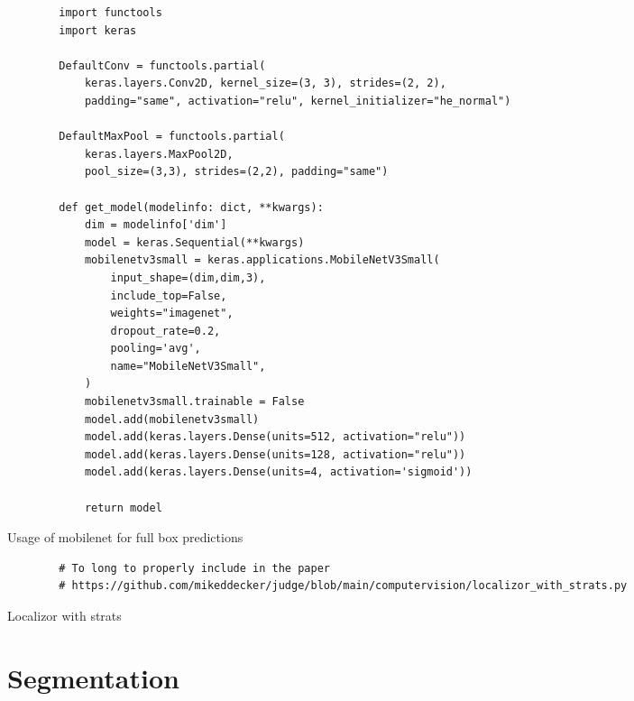 \begin{listing}
    \begin{verbatim}
        import functools
        import keras

        DefaultConv = functools.partial(
            keras.layers.Conv2D, kernel_size=(3, 3), strides=(2, 2),
            padding="same", activation="relu", kernel_initializer="he_normal")

        DefaultMaxPool = functools.partial(
            keras.layers.MaxPool2D,
            pool_size=(3,3), strides=(2,2), padding="same")

        def get_model(modelinfo: dict, **kwargs):
            dim = modelinfo['dim']
            model = keras.Sequential(**kwargs)
            mobilenetv3small = keras.applications.MobileNetV3Small(
                input_shape=(dim,dim,3),
                include_top=False,
                weights="imagenet",
                dropout_rate=0.2,
                pooling='avg',
                name="MobileNetV3Small",
            )
            mobilenetv3small.trainable = False
            model.add(mobilenetv3small)
            model.add(keras.layers.Dense(units=512, activation="relu"))
            model.add(keras.layers.Dense(units=128, activation="relu"))
            model.add(keras.layers.Dense(units=4, activation='sigmoid'))

            return model
    \end{verbatim}
    \caption[keras mobilenet full boxes]{Usage of mobilenet for full box predictions}
    \label{code:keras-mobilenetv3small}
\end{listing}

\begin{listing}
    \begin{verbatim}
        # To long to properly include in the paper
        # https://github.com/mikeddecker/judge/blob/main/computervision/localizor_with_strats.py
    \end{verbatim}
    \caption[Localizor with strats]{Localizor with strats}
    \label{code:localizor-with-strats}
\end{listing}

\section{Segmentation}
\label{sec:code-segmentation}


